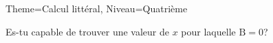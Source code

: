 \documentclass[11pt]{article}
\begin{document}
\begin{multicols}{2}
\begin{Maquette}[Fiche]{Theme=Calcul littéral, Niveau=Quatrième}
\begin{exercice}
    Es-tu capable de trouver une valeur de $x$ pour laquelle $\textrm{B}=0$?
\end{exercice}

\end{Maquette}

\end{multicols}
\end{document}
